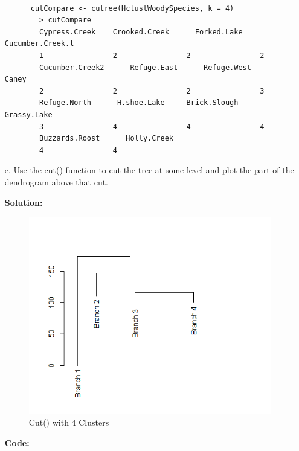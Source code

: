 \documentclass[12pt]{article}
\makeatletter
\theoremstyle{homework}
\newenvironment{exercise}[1]
{\def\@currentlabel{#1}\exercisecore}
{\endexercisecore}
\newcommand{\localhead}[1]{\par\smallskip\noindent\textbf{#1}\nobreak\\}%
\newcommand\solution{\localhead{Solution:}}
\makeatother
\begin{document}
\begin{exercise}{2}
\begin{enumerate}
\begin{footnotesize}
\begin{verbatim}
    
      cutCompare <- cutree(HclustWoodySpecies, k = 4)
        > cutCompare
        Cypress.Creek    Crooked.Creek      Forked.Lake Cucumber.Creek.l 
        1                2                2                2 
        Cucumber.Creek2      Refuge.East      Refuge.West            Caney 
        2                2                2                3 
        Refuge.North      H.shoe.Lake     Brick.Slough      Grassy.Lake 
        3                4                4                4 
        Buzzards.Roost      Holly.Creek 
        4                4 
    \end{verbatim}
  \end{footnotesize}
  \vspace{.25in}

  \item[e.] Use the cut() function to cut the tree at some level and plot the part of the dendrogram above that cut.\\
  \solution 

  \begin{figure}[H]
    \begin{center}
      \caption{Cut() with 4 Clusters}
    \includegraphics[width = .70\textwidth]{Rplot09.png}
    \end{center}
\end{figure}

  \textbf{Code:}
  \begin{center}
  
  \end{center}

\end{enumerate}
  
\end{exercise}
\vspace{.5in}
\end{document}
